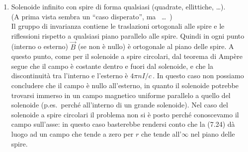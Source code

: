 \begin{enumerate}
    le sorgenti sono invarianti per riflessioni rispetto a qualsiasi piano
    parallelo ad $\vec{\mathcal J}$ e ortogonale a $\Sigma$, quindi $\vec B$ \`e
    parallelo a $\Sigma$ e ortogonale a $\vec{\mathcal J}$; inoltre anche
    $\Sigma$ \`e piano di simmetria per le sorgenti, quindi in punti simmetrici
    rispetto a $\Sigma$ l'unica componente non nulla di $\vec B$, essendo
    parallela a $\Sigma$, ha valori opposti e il teorema di Amp\`ere (come nel
    caso del solenoide) permette di concludere che \`e costante da ciascuna
    parte di $\Sigma$ e che vale
    \begin{equation}
      \vec B=\frac{2\pi}{c}\vec{\mathcal J}\wedge\hat n_P
      \tag{7.43}
    \end{equation}
    dove $\hat n_P$ \`e la normale a $\Sigma$ diretta verso il punto $P$ in cui
    si calcola $\vec B$.
  \item Solenoide infinito con spire di forma qualsiasi (quadrate, ellittiche,
    \dots).\\
    (A prima vista sembra un ``caso disperato'', ma \ \dots\ )\\
    Il gruppo di invarianza contiene le traslazioni ortogonali alle spire e le
    riflessioni rispetto a qualsiasi piano parallelo alle spire. Quindi in ogni
    punto (interno o esterno) $\vec B$ (se non \`e nullo) \`e ortogonale al
    piano delle spire. A questo punto, come per il solenoide a spire circolari,
    dal teorema di Amp\`ere segue che il campo \`e costante dentro e fuori dal
    solenoide, e che la discontinuit\`a tra l'interno e l'esterno \`e
    $4\pi nI/c$\,. In questo caso non possiamo concludere che il campo \`e nullo
    all'esterno, in quanto il solenoide potrebbe trovarsi immerso in un campo
    magnetico uniforme parallelo a quello del solenoide (p.es.\ perch\'e
    all'interno di un grande solenoide). Nel caso del solenoide a spire
    circolari il problema non si \`e posto perch\'e conoscevamo il campo
    sull'asse: in questo caso basterebbe rendersi conto che la (7.24) d\`a luogo
    ad un campo che tende a zero per $r$ che tende all'$\infty$ nel piano delle
    spire.


\end{enumerate}
